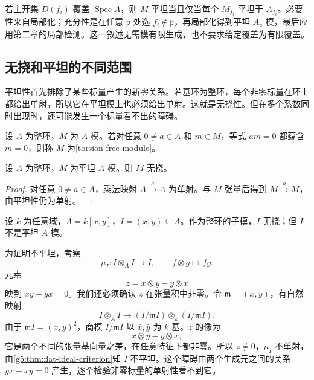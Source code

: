 \ProseParagraphBreak

若主开集 \(D(f_i)\) 覆盖 \(\operatorname{Spec}A\)，则 \(M\) 平坦当且仅当每个 \(M_{f_i}\) 平坦于 \(A_{f_i}\)。必要性来自局部化；充分性是在任意 \(\mathfrak p\) 处选 \(f_i\notin\mathfrak p\)，再局部化得到平坦 \(A_{\mathfrak p}\) 模，最后应用第二章的局部检测。这一叙述无需模有限生成，也不要求给定覆盖为有限覆盖。

\subsection{无挠和平坦的不同范围}
\label{g5:subsec:0601:05}

平坦性首先排除了某些标量产生的新零关系。若基环为整环，每个非零标量在环上都给出单射，所以它在平坦模上也必须给出单射。这就是无挠性。但在多个系数同时出现时，还可能发生一个标量看不出的障碍。

\begin{definition}\label{g5:def:torsion-free-module}
	设 \(A\) 为整环，\(M\) 为 \(A\) 模。若对任意 \(0\ne a\in A\) 和 \(m\in M\)，等式 \(am=0\) 都蕴含 \(m=0\)，则称 \(M\) 为[torsion-free module]。
\end{definition}

\begin{proposition}\label{g5:prop:flat-torsion-free}
	设 \(A\) 为整环，\(M\) 为平坦 \(A\) 模。则 \(M\) 无挠。
\end{proposition}
\begin{proof}
	对任意 \(0\ne a\in A\)，乘法映射 \(A\xrightarrow{a}A\) 为单射。与 \(M\) 张量后得到 \(M\xrightarrow{a}M\)，由平坦性仍为单射。
\end{proof}

\begin{example}\label{g5:exm:torsion-free-nonflat-ideal}
	设 \(k\) 为任意域，\(A=k[x,y]\)，\(I=(x,y)\subseteq A\)。作为整环的子模，\(I\) 无挠；但 \(I\) 不是平坦 \(A\) 模。

	为证明不平坦，考察
	\[
		\mu_I:I\otimes_A I\longrightarrow I,\qquad
		f\otimes g\longmapsto fg.
	\]
	元素
	\[
		z=x\otimes y-y\otimes x
	\]
	映到 \(xy-yx=0\)。我们还必须确认 \(z\) 在张量积中非零。令 \(\mathfrak m=(x,y)\)，有自然映射
	\[
		I\otimes_A I\longrightarrow
		(I/\mathfrak mI)\otimes_k(I/\mathfrak mI).
	\]
	由于 \(\mathfrak mI=(x,y)^2\)，商模 \(I/\mathfrak mI\) 以 \(\bar x,\bar y\) 为 \(k\) 基。\(z\) 的像为
	\[
		\bar x\otimes\bar y-\bar y\otimes\bar x,
	\]
	它是两个不同的张量基向量之差，在任意特征下都非零。所以 \(z\ne0\)，\(\mu_I\) 不单射，由\cref{g5:thm:flat-ideal-criterion}知 \(I\) 不平坦。这个障碍由两个生成元之间的关系 \(yx-xy=0\) 产生，逐个检验非零标量的单射性看不到它。
\end{example}

